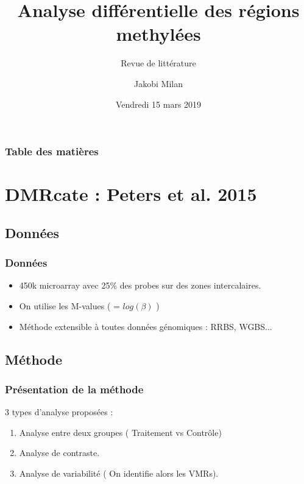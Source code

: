 \documentclass{beamer}
\begin{document}
\title[identification DMRs] 
{Analyse différentielle des régions methylées}
\subtitle{Revue de littérature}
\author{Jakobi Milan}
\date[KPT 2004]{Vendredi 15 mars 2019}






\frame{\titlepage}

\begin{frame}
\frametitle{Table des matières}
\tableofcontents
\end{frame}


\section{DMRcate : Peters et al. 2015}
\subsection{Données}

\begin{frame}
\frametitle{Données}
\begin{itemize}
\item<1-> 450k microarray avec 25\% des probes sur des zones intercalaires.
\item<1-> On utilise les M-values ( = $log(\beta)$ )
\item<2-> Méthode extensible à toutes données génomiques : RRBS, WGBS...

\end{itemize}
\end{frame}

\subsection{Méthode}
\begin{frame}
\frametitle{Présentation de la méthode}
3 types d'analyse proposées :
\begin{enumerate}
\item<2-> Analyse entre deux groupes ( Traitement vs Contrôle)
\item<2-> Analyse de contraste.
\item<2-> Analyse de variabilité ( On identifie alors les VMRs).
\end{enumerate}
\end{frame}
\end{document}
